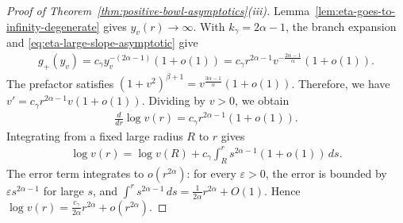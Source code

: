 \documentclass{amsart}
\theoremstyle{plain}
\theoremstyle{mainintrothm}
\theoremstyle{definition}
\begin{document}
	\begin{proof}[Proof of Theorem~\ref{thm:positive-bowl-asymptotics}\textup{(iii)}]
		Lemma~\ref{lem:eta-goes-to-infinity-degenerate} gives
		$y_v(r)\to\infty$.  With $k_\gamma=2\alpha-1$, the branch expansion and
		\eqref{eq:eta-large-slope-asymptotic} give
		\begin{align*}
			g_+(y_v)
			=
			c_\gamma y_v^{-(2\alpha-1)}(1+o(1))
			=
			c_\gamma r^{2\alpha-1}
			v^{-\frac{2\alpha-1}{\alpha}}(1+o(1)).
		\end{align*}
		The prefactor satisfies $(1+v^2)^{\beta+1}=v^{\frac{3\alpha-1}{\alpha}}(1+o(1))$.
		Therefore, we have $v'=c_\gamma r^{2\alpha-1}v(1+o(1))$. Dividing by $v>0$, we obtain
		\begin{align*}
			\frac{d}{dr}\log v(r)
			=
			c_\gamma r^{2\alpha-1}(1+o(1)).
		\end{align*}
		Integrating from a fixed large radius $R$ to $r$ gives
		\begin{align*}
			\log v(r)
			=
			\log v(R)
			+
			c_\gamma\int_R^r s^{2\alpha-1}(1+o(1))\,ds.
		\end{align*}
		The error term integrates to $o(r^{2\alpha})$: for every $\varepsilon>0$,
		the error is bounded by $\varepsilon s^{2\alpha-1}$ for large $s$, and
		$\int^r s^{2\alpha-1}\,ds=\frac{1}{2\alpha}r^{2\alpha}+O(1)$.  Hence
		$\log v(r)=\frac{c_\gamma}{2\alpha}r^{2\alpha}+o(r^{2\alpha})$.
	\end{proof}
	
\end{document}
